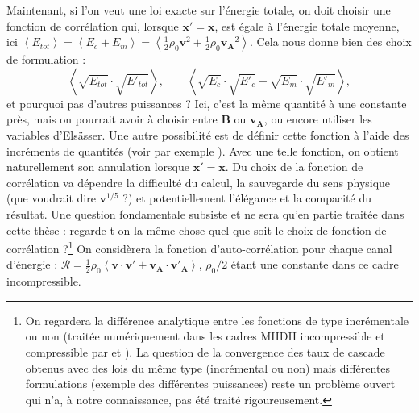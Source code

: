 Maintenant, si l'on veut une loi exacte sur l'énergie totale, on doit choisir une fonction de corrélation qui, lorsque $\boldsymbol{x'}= \boldsymbol{x}$, est égale à l'énergie totale moyenne, ici $\left<E_{tot}\right> = \left<E_c + E_m\right> = \left<\frac{1}{2} \rho_0 \boldsymbol{v}^2 + \frac{1}{2} \rho_0 \boldsymbol{v_A}^2\right>$. Cela nous donne bien des choix de formulation : 
\[\left<\sqrt{E_{tot}} \cdot \sqrt{E'_{tot}}\right>, \qquad \left<\sqrt{E_c} \cdot \sqrt{E'_c} + \sqrt{E_m} \cdot \sqrt{E'_m} \right>,\] et pourquoi pas d'autres puissances ? Ici, c'est la même quantité à une constante près, mais on pourrait avoir à choisir entre $\boldsymbol{B}$ ou $\boldsymbol{v_A}$, ou encore utiliser les variables d'Elsässer. Une autre possibilité est de définir cette fonction à l'aide des incréments de quantités (voir par exemple \cite{antonia_analogy_1997}). Avec une telle fonction, on obtient naturellement son annulation lorsque $\boldsymbol{x'}= \boldsymbol{x}$. Du choix de la fonction de corrélation va dépendre la difficulté du calcul, la sauvegarde du sens physique (que voudrait dire $\boldsymbol{v}^{1/5}$ ?) et potentiellement l'élégance et la compacité du résultat. Une question fondamentale subsiste et ne sera qu'en partie traitée dans cette thèse : regarde-t-on la même chose quel que soit le choix de fonction de corrélation ?\footnote{On regardera la différence analytique entre les fonctions de type incrémentale ou non (traitée numériquement dans les cadres \ac{MHDH} incompressible et compressible par \cite{ferrand_exact_2019} et \cite{ferrand_-depth_2022}). La question de la convergence des taux de cascade obtenus avec des lois du même type (incrémental ou non) mais différentes formulations (exemple des différentes puissances) reste un problème ouvert qui n'a, à notre connaissance, pas été traité rigoureusement.} On considèrera la fonction d'auto-corrélation pour chaque canal d'énergie : $\mathcal{R} = \frac{1}{2} \rho_0\left< \boldsymbol{v} \cdot \boldsymbol{v'} + \boldsymbol{v_A} \cdot \boldsymbol{v'_A}\right>$, $\rho_0/2$ étant une constante dans ce cadre incompressible. 

